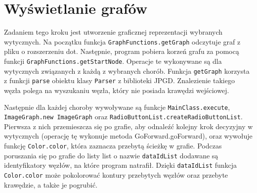 \section{Wyświetlanie grafów}

Zadaniem tego kroku jest utworzenie graficznej reprezentacji wybranych wytycznych.
Na początku funkcja \texttt{GraphFunctions.getGraph} odczytuje graf z pliku o rozszerzeniu dot. Następnie, program pobiera 
korzeń grafu za pomocą funkcji \texttt{GraphFunctions.getStartNode}. Operacje te wykonywane są dla wytycznych związanych z każdą z wybranych chorób. Funkcja \texttt{getGraph} korzysta z funkcji \texttt{parse} obiektu klasy \texttt{Parser} z biblioteki JPGD. 
Znalezienie takiego węzła polega na wyszukaniu węzła, który nie posiada 
krawędzi wejściowej. 

Następnie dla każdej choroby wywoływane są funkcje \texttt{MainClass.execute}, \texttt{ImageGraph.new ImageGraph} oraz \texttt{RadioButtonList.createRadioButtonList}. Pierwsza z nich przemieszcza się po grafie, 
aby odnaleźć kolejny krok decyzyjny w wytycznych (operację tę wykonuje metoda GoForward.goForward), oraz wywołuje funkcję \texttt{Color.color}, która zaznacza przebytą ścieżkę w grafie. Podczas poruszania się po grafie do listy list o nazwie \texttt{dataIdList} dodawane są identyfikatory węzłów, na które program natrafił. Dzięki \texttt{dataIdList} funkcja \texttt{Color.color} może pokolorować kontury przebytych węzłów oraz przebyte krawędzie, a także je pogrubić. 

